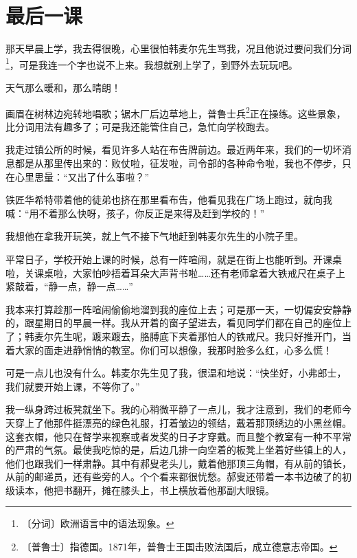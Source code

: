 \documentclass[12pt,UTF-8,openany]{ctexbook}
\begin{document}
\chapter{最后一课}

\begin{large}
    
    那天早晨上学，我去得很晚，心里很怕韩麦尔先生骂我，况且他说过要问我们分词\footnote{〔分词〕欧洲语言中的语法现象。}，可是我连一个字也说不上来。我想就别上学了，到野外去玩玩吧。
    
    天气那么暖和，那么晴朗！
    
    画眉在树林边宛转地唱歌；锯木厂后边草地上，普鲁士兵\footnote{〔普鲁士〕指德国。1871年，普鲁士王国击败法国后，成立德意志帝国。}正在操练。这些景象，比分词用法有趣多了；可是我还能管住自己，急忙向学校跑去。
    
    我走过镇公所的时候，看见许多人站在布告牌前边。最近两年来，我们的一切坏消息都是从那里传出来的：败仗啦，征发啦，司令部的各种命令啦，我也不停步，只在心里思量：“又出了什么事啦？”
    
    铁匠华希特带着他的徒弟也挤在那里看布告，他看见我在广场上跑过，就向我喊：“用不着那么快呀，孩子，你反正是来得及赶到学校的！”
    
    我想他在拿我开玩笑，就上气不接下气地赶到韩麦尔先生的小院子里。
    
    平常日子，学校开始上课的时候，总有一阵喧闹，就是在街上也能听到。开课桌啦，关课桌啦，大家怕吵捂着耳朵大声背书啦……还有老师拿着大铁戒尺在桌子上紧敲着，“静一点，静一点……”
    
    我本来打算趁那一阵喧闹偷偷地溜到我的座位上去；可是那一天，一切偏安安静静的，跟星期日的早晨一样。我从开着的窗子望进去，看见同学们都在自己的座位上了；韩麦尔先生呢，踱来踱去，胳膊底下夹着那怕人的铁戒尺。我只好推开门，当着大家的面走进静悄悄的教室。你们可以想像，我那时脸多么红，心多么慌！
    
    可是一点儿也没有什么。韩麦尔先生见了我，很温和地说：“快坐好，小弗郎士，我们就要开始上课，不等你了。”
    
    我一纵身跨过板凳就坐下。我的心稍微平静了一点儿，我才注意到，我们的老师今天穿上了他那件挺漂亮的绿色礼服，打着皱边的领结，戴着那顶绣边的小黑丝帽。这套衣帽，他只在督学来视察或者发奖的日子才穿戴。而且整个教室有一种不平常的严肃的气氛。最使我吃惊的是，后边几排一向空着的板凳上坐着好些镇上的人，他们也跟我们一样肃静。其中有郝叟老头儿，戴着他那顶三角帽，有从前的镇长，从前的邮递员，还有些旁的人。个个看来都很忧愁。郝叟还带着一本书边破了的初级读本，他把书翻开，摊在膝头上，书上横放着他那副大眼镜。
    

\end{large}
\end{document}
